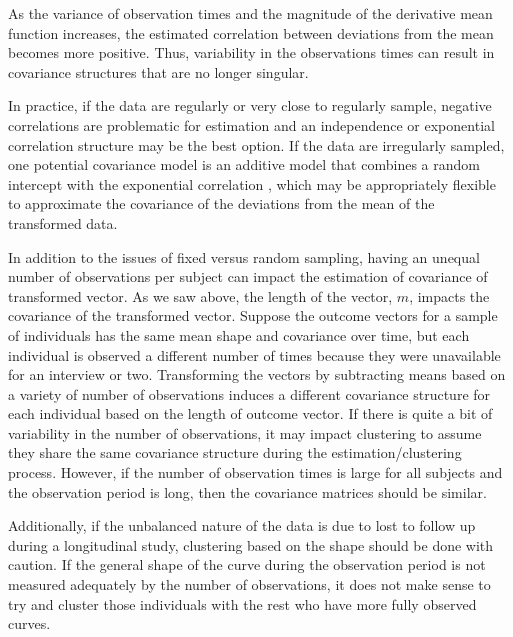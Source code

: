 As the variance of observation times and the magnitude of the derivative mean function increases, the estimated correlation between deviations from the mean becomes more positive. Thus, variability in the observations times can result in covariance structures that are no longer singular. 

In practice, if the data are regularly or very close to regularly sample, negative correlations are problematic for estimation and an independence or exponential correlation structure may be the best option. If the data are irregularly sampled, one potential covariance model is an additive model that combines a random intercept with the exponential correlation \cite{diggle2002}, which may be appropriately flexible to approximate the covariance of the deviations from the mean of the transformed data.

In addition to the issues of fixed versus random sampling, having an unequal number of observations per subject can impact the estimation of covariance of transformed vector. As we saw above, the length of the vector, $m$, impacts the covariance of the transformed vector. Suppose the outcome vectors for a sample of individuals has the same mean shape and covariance over time, but each individual is observed a different number of times because they were unavailable for an interview or two. Transforming the vectors by subtracting means based on a variety of number of observations induces a different covariance structure for each individual based on the length of outcome vector. If there is quite a bit of variability in the number of observations, it may impact clustering to assume they share the same covariance structure during the estimation/clustering process. However, if the number of observation times is large for all subjects and the observation period is long, then the covariance matrices should be similar. 

Additionally, if the unbalanced nature of the data is due to lost to follow up during a longitudinal study, clustering based on the shape should be done with caution. If the general shape of the curve during the observation period is not measured adequately by the number of observations, it does not make sense to try and cluster those individuals with the rest who have more fully observed curves. 

